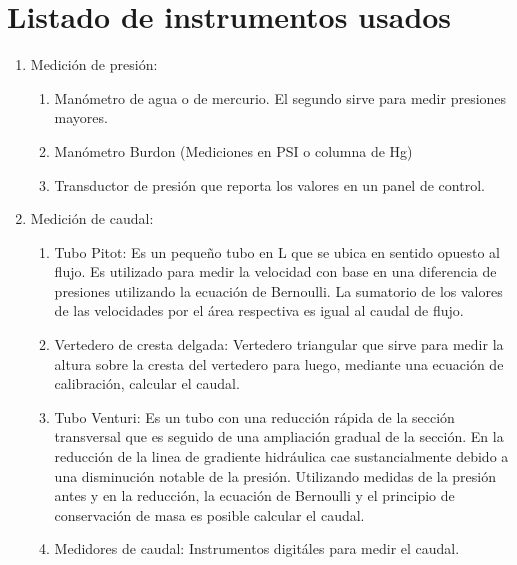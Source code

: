 \documentclass[10pt, a4paper]{exam}
\begin{document}
\section{Listado de instrumentos usados}
\begin{enumerate}
\item Medici\'on de presi\'on:
\begin{enumerate}
\item Man\'ometro de agua o de mercurio. El segundo sirve para medir presiones mayores.
\item Man\'ometro Burdon (Mediciones en PSI o columna de Hg)
\item Transductor de presi\'on que reporta los valores en un panel de control.
\end{enumerate}
\item Medici\'on de caudal:
\begin{enumerate}
\item Tubo Pitot: Es un peque\~no tubo en L que se ubica en sentido opuesto al flujo. Es utilizado para medir la velocidad con base en una diferencia de presiones utilizando la ecuaci\'on de Bernoulli. La sumatorio de los valores de las velocidades por el \'area respectiva es igual al caudal de flujo. 
\item Vertedero de cresta delgada: Vertedero triangular que sirve para medir la altura sobre la cresta del vertedero para luego, mediante una ecuaci\'on de calibraci\'on, calcular el caudal.
\item Tubo Venturi: Es un tubo con una reducci\'on r\'apida de la secci\'on transversal que es seguido de una ampliaci\'on gradual de la secci\'on. En la reducci\'on de la linea de gradiente hidr\'aulica cae sustancialmente debido a una disminuci\'on notable de la presi\'on. Utilizando medidas de la presi\'on antes y en la reducci\'on, la ecuaci\'on de Bernoulli y el principio de conservaci\'on de masa es posible calcular el caudal.
\item Medidores de caudal: Instrumentos digit\'ales para medir el caudal.
\end{enumerate}
\end{enumerate}
\end{document}
